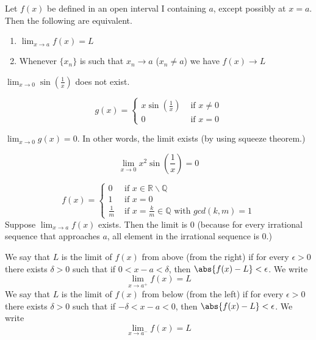 

\begin{thm}
Let $f(x)$ be defined in an open interval I containing $a$, except possibly at $x=a$. Then the following are equivalent.
\begin{enumerate}
\item \(\displaystyle\lim_{x\to a} f(x) = L\)
\item Whenever $\{x_n\}$ is such that $x_n\to a$ ($x_n\neq a$) we have $f(x)\to L$
\end{enumerate}
\end{thm}

\begin{exmp}
$\displaystyle \lim_{x\to 0} \sin (\frac{1}{x})$ does not exist.
\end{exmp}

\begin{exmp}
\[g(x) = \begin{cases}
    x\sin(\frac{1}{x}) & \text{ if } x\neq 0\\
    0 & \text{ if } x= 0
\end{cases}\]

$\displaystyle\lim_{x\to 0} g(x) = 0$. In other words, the limit exists (by using squeeze theorem.)
\end{exmp}

\begin{exmp}
\[\lim_{x\to 0} x^2\sin (\frac{1}{x})= 0\]
\end{exmp}

\begin{exmp}
\[f(x) = \begin{cases}
0 & \text{ if } x\in \mathbb{R}\backslash\mathbb{Q} \\
1 & \text{ if } x= 0 \\
\frac{1}{m} & \text{ if } x = \frac{k}{m} \in \mathbb{Q} \text{ with } gcd(k,m) = 1
\end{cases}\]
Suppose $\lim_{x\to a} f(x)$ exists. Then the limit is $0$ (because for every irrational sequence that approaches $a$, all element in the irrational sequence is $0$.)
\end{exmp}

\begin{defn}
We say that $L$ is the limit of $f(x)$ from above (from the right) if for every $\epsilon > 0$ there exists $\delta > 0$ such that if $0<x-a<\delta$, then $\abs{f(x) - L}<\epsilon$. We write \[\lim_{x\to a^+} f(x) = L\]
We say that $L$ is the limit of $f(x)$ from below (from the left) if for every $\epsilon > 0$ there exists $\delta > 0$ such that if $-\delta<x-a<0$, then $\abs{f(x) - L}<\epsilon$. We write \[\lim_{x\to a^-} f(x) = L\]
\end{defn}